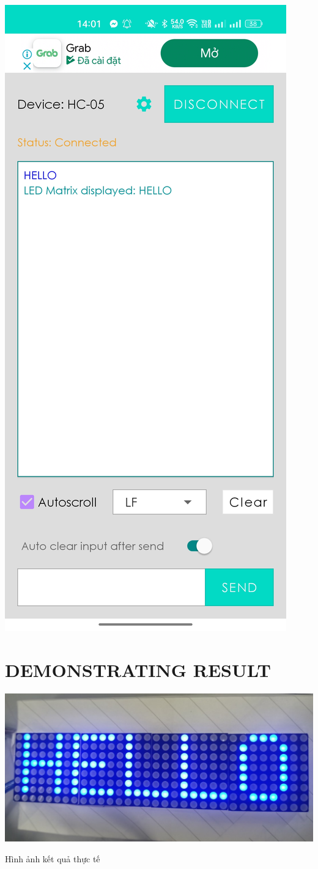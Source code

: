 \documentclass[conference]{IEEEtran}
\begin{document}
        \includegraphics[width=0.7\linewidth]{6.jpg}
        \label{fig:enter-label}

        
\section{\textbf{DEMONSTRATING RESULT}}
    \centering
    \includegraphics[width=1\linewidth]{Hello.jpg}
    \caption{Hình ảnh kết quả thực tế}
    \label{fig:enter-label}
\end{document}
